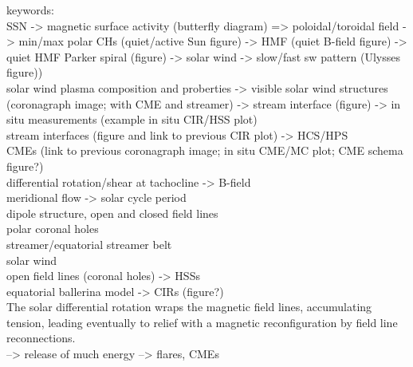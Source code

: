 keywords:\\
SSN -> magnetic surface activity (butterfly diagram) => poloidal/toroidal field -> min/max polar CHs (quiet/active Sun figure) -> HMF (quiet B-field figure) -> quiet HMF Parker spiral (figure) -> solar wind -> slow/fast sw pattern (Ulysses figure))\\

solar wind plasma composition and proberties -> visible solar wind structures (coronagraph image; with CME and streamer) -> stream interface (figure) -> in situ measurements (example in situ CIR/HSS plot)\\

stream interfaces (figure and link to previous CIR plot) -> HCS/HPS\\

CMEs (link to previous coronagraph image; in situ CME/MC plot; CME schema figure?)\\

differential rotation/shear at tachocline -> B-field\\
meridional flow -> solar cycle period\\
dipole structure, open and closed field lines\\
polar coronal holes\\
streamer/equatorial streamer belt\\
solar wind\\

open field lines (coronal holes) -> HSSs\\
equatorial ballerina model -> CIRs (figure?)\\

The solar differential rotation wraps the magnetic field lines, accumulating tension, leading eventually to relief with a magnetic reconfiguration by field line reconnections.\\
--> release of much energy --> flares, CMEs\\


